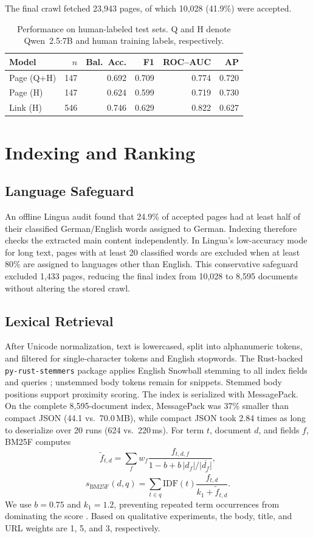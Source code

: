 \documentclass{article}
\begin{document}
The final crawl fetched 23,943 pages, of which 10,028 (41.9\%) were accepted.

\begin{table}[t]
  \centering
  \caption{Performance on human-labeled test sets. Q and H denote
  Qwen~2.5:7B and human training labels, respectively.}
  \label{tab:verdict-benchmark}
  \small
  \setlength{\tabcolsep}{3pt}
  \begin{tabular}{@{}lrrrrr@{}}
    \toprule
    Model & $n$ & Bal.\ Acc. & F1 & ROC--AUC & AP \\
    \midrule
    Page (Q+H) & 147 & 0.692 & 0.709 & 0.774 & 0.720 \\
    Page (H) & 147 & 0.624 & 0.599 & 0.719 & 0.730 \\
    Link (H) & 546 & 0.746 & 0.629 & 0.822 & 0.627 \\
    \bottomrule
  \end{tabular}
\end{table}

\section{Indexing and Ranking}

\subsection{Language Safeguard}
An offline Lingua audit \citep{lingua} found that 24.9\% of accepted pages had
at least half of their classified German/English words assigned to German.
Indexing therefore checks the extracted main content independently. In
Lingua's low-accuracy mode for long text, pages with at least 20 classified
words are excluded when at least 80\% are assigned to languages other than
English. This conservative safeguard excluded 1,433 pages, reducing the final
index from 10,028 to 8,595 documents without altering the stored crawl.

\subsection{Lexical Retrieval}
After Unicode normalization, text is lowercased, split into alphanumeric
tokens, and filtered for single-character tokens and English stopwords. The
Rust-backed \texttt{py-rust-stemmers} package applies English Snowball stemming
to all index fields and queries \citep{pyruststemmers}; unstemmed body tokens
remain for snippets. Stemmed body positions support proximity scoring. The
index is serialized with MessagePack. On the
complete 8,595-document index, MessagePack was 37\% smaller than compact JSON
(44.1 vs.\ 70.0\,MB), while compact JSON took 2.84 times as long to
deserialize over 20 runs (624 vs.\ 220\,ms). For term $t$, document $d$, and fields $f$,
BM25F computes
\[
\tilde f_{t,d}=\sum_f w_f
\frac{f_{t,d,f}}{1-b+b\,|d_f|/\overline{|d_f|}},
\]
\[
s_{\mathrm{BM25F}}(d,q)=
\sum_{t\in q}\mathrm{IDF}(t)\frac{\tilde f_{t,d}}{k_1+\tilde f_{t,d}}.
\]
We use $b=0.75$ and $k_1=1.2$, preventing repeated term occurrences from
dominating the score \citep{robertson2004bm25f}. Based on qualitative experiments,
the body, title, and URL weights are 1, 5, and 3, respectively.
\end{document}
